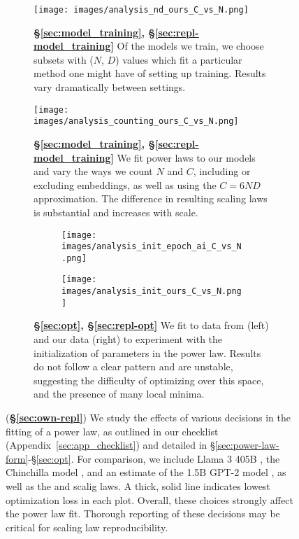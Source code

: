 

\begin{figure}[!h]
\centering

\begin{subfigure}{0.48\textwidth}
    \centering
    \texttt{[image: images/analysis\_nd\_ours\_C\_vs\_N.png]}
    \caption{\textbf{\S\ref{sec:model_training}, \S\ref{sec:repl-model_training}} Of the models we train, we choose subsets with ($N$, $D$) values which fit a particular method one might have of setting up training. Results vary dramatically between settings.}
    \label{fig:analysis_nd_ours_main}
\end{subfigure}
\hfill
\begin{subfigure}{0.47\textwidth}
    \centering
    \texttt{[image: images/analysis\_counting\_ours\_C\_vs\_N.png]}
    \caption{\textbf{\S\ref{sec:model_training}, \S\ref{sec:repl-model_training}} We fit power laws to our models and vary the ways we count $N$ and $C$, including or excluding embeddings, as well as using the $C=6ND$ approximation.
    The difference in resulting scaling laws is substantial and increases with scale. 
    }
    \label{fig:analysis_counting_ours_main}
\end{subfigure}


\begin{subfigure}{\textwidth}
\begin{subfigure}{0.49\textwidth}
    \centering
    \texttt{[image: images/analysis\_init\_epoch\_ai\_C\_vs\_N.png]}
\end{subfigure}
\hfill
\begin{subfigure}{0.49\textwidth}
    \centering
    \texttt{[image: images/analysis\_init\_ours\_C\_vs\_N.png]}
\end{subfigure}
\caption{\textbf{\S\ref{sec:opt}, \S\ref{sec:repl-opt}} We fit to data from \citet{besiroglu2024chinchilla} (left) and our data (right) to experiment with the initialization of parameters in the power law. Results do not follow a clear pattern and are unstable, suggesting the difficulty of optimizing over this space, and the presence of many local minima.
}
\label{fig:analysis_init_main}
\end{subfigure}

\caption{(\textbf{\S\ref{sec:own-repl}}) We study the effects of various decisions in the fitting of a power law, as outlined in our checklist (Appendix~\ref{sec:app_checklist}) and detailed in \S\ref{sec:power-law-form}-\S\ref{sec:opt}. For comparison, we include Llama 3 405B \citep{dubey2024llama}, the Chinchilla model \citep{hoffmann2022training}, and an estimate of the 1.5B GPT-2 model \citep{radford2019language}, as well as the \citep{kaplan2020scaling} and \citep{hoffmann2022training} scalig laws. A thick, solid line indicates lowest optimization loss in each plot. Overall, these choices strongly affect the power law fit. Thorough reporting of these decisions may be critical for scaling law reproducibility.
}
\label{fig:overall}
\end{figure}
